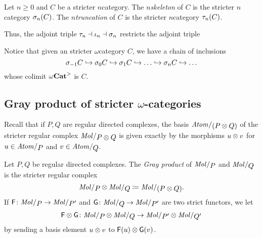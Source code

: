 \begin{dfn}
    Let \( n \geq 0 \) and \( C \) be a stricter \( n \)\nbd category.
    The \emph{\( n \)\nbd skeleton} of \( C \) is the stricter \( n \)\nbd category \( \sigma_{n}(C) \).
    The \emph{\( n \)\nbd truncation} of \( C \) is the stricter \( n \)\nbd category \( \tau_{n}(C) \).
\end{dfn}

\noindent Thus, the adjoint triple \( \tau_{n} \dashv \iota_n \dashv \sigma_{n} \) restricts the adjoint triple
\begin{center}
\end{center}
Notice that given an stricter \( \omega \)\nbd category \( C \), we have a chain of inclusions 
\begin{equation*}
    \sigma_{-1} C \hookrightarrow \sigma_{0} C \hookrightarrow \sigma_{1} C \hookrightarrow \ldots \hookrightarrow \sigma_{n} C \hookrightarrow \ldots
\end{equation*}
whose colimit \( {\omega\mathbf{Cat}}^> \) is \( C \).


\subsection{Gray product of stricter \texorpdfstring{$\omega$}{}-categories}

Recall that if \( P, Q \) are regular directed complexes, the basis \( \atomin{(P \gray Q)} \) of the stricter regular complex \( \molecin{P \gray Q} \) is given exactly by the morphisms \( u \otimes v \) for \( u \in \atomin{P} \) and \( v \in \atomin{Q} \).  

\begin{dfn}  \label{dfn:gray_product_of_stricter_regular_complexes}
    Let \( P, Q \) be regular directed complexes.
    The \emph{Gray product} of \( \molecin{P} \) and \( \molecin{Q} \) is the stricter regular complex
    \begin{equation*}
        \molecin{P} \gray \molecin{Q} \eqdef \molecin{(P \gray Q)}.
    \end{equation*}
    If \( \F \colon \molecin{P} \to \molecin{P'} \) and \( \G \colon \molecin{Q} \to \molecin{P'} \) are two strict functors, we let 
    \begin{equation*}
        \F \gray \G \colon \molecin{P} \gray \molecin{Q} \to  \molecin{P'} \gray \molecin{Q'}
    \end{equation*}
    by sending a basis element \( u \otimes v \) to \( \mathsf{F}(u) \otimes \mathsf{G}(v) \).
\end{dfn}

